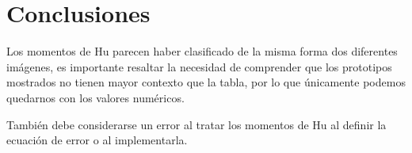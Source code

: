 \documentclass[10pt]{IEEEtran}
\begin{document}
  \section{Conclusiones}
  Los momentos de Hu parecen haber clasificado de la misma forma dos diferentes
  imágenes, es importante resaltar la necesidad de comprender que los prototipos
  mostrados no tienen mayor contexto que la tabla, por lo que únicamente podemos
  quedarnos con los valores numéricos.

  También debe considerarse un error al tratar los momentos de Hu al definir la
  ecuación de error o al implementarla.

  \printbibliography
\end{document}

